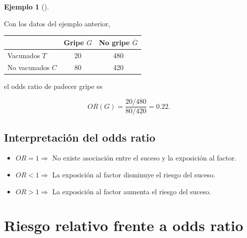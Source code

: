 \documentclass[
  spanish,
  a4paper,
]{scrreport}
\newcounter{none} %
\providecommand{\tightlist}{%
  \setlength{\itemsep}{0pt}\setlength{\parskip}{0pt}}
\theoremstyle{definition}
\theoremstyle{definition}
\newtheorem{example}{Ejemplo}[chapter]
\theoremstyle{remark}
\begin{document}
\begin{example}[]\protect\hypertarget{exm-odds-ratio}{}\label{exm-odds-ratio}

Con los datos del ejemplo anterior,

{\def\LTcaptype{none} %
\begin{longtable}[]{@{}lcc@{}}
\toprule\noalign{}
& Gripe \(G\) & No gripe \(\overline{G}\) \\
\midrule\noalign{}
\endhead
\bottomrule\noalign{}
\endlastfoot
Vacunados \(T\) & 20 & 480 \\
No vacunados \(C\) & 80 & 420 \\
\end{longtable}
}

el odds ratio de padecer gripe es

\[OR(G) = \frac{20/480}{80/420} = 0.22.\]

\end{example}

\subsection{Interpretación del odds
ratio}\label{interpretaciuxf3n-del-odds-ratio}

\begin{tcolorbox}[enhanced jigsaw, arc=.35mm, bottomrule=.15mm, bottomtitle=1mm, breakable, colback=white, colbacktitle=quarto-callout-note-color!10!white, colframe=quarto-callout-note-color-frame, coltitle=black, left=2mm, leftrule=.75mm, opacityback=0, opacitybacktitle=0.6, rightrule=.15mm, title=\textcolor{quarto-callout-note-color}{\faInfo}\hspace{0.5em}{Interpretación}, titlerule=0mm, toprule=.15mm, toptitle=1mm]

\begin{itemize}
\tightlist
\item
  \(OR=1 \Rightarrow\) No existe asociación entre el suceso y la
  exposición al factor.
\item
  \(OR<1 \Rightarrow\) La exposición al factor disminuye el riesgo del
  suceso.
\item
  \(OR>1 \Rightarrow\) La exposición al factor aumenta el riesgo del
  suceso.
\end{itemize}

\end{tcolorbox}

\section{Riesgo relativo frente a odds
ratio}\label{riesgo-relativo-frente-a-odds-ratio}
\end{document}
